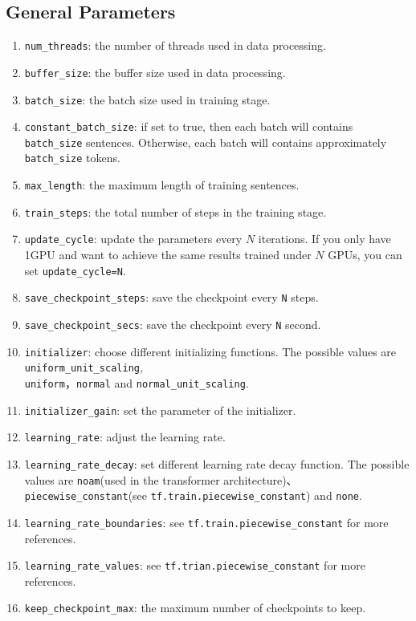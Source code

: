 \documentclass{article}
\begin{document}
\subsection{General Parameters}
\begin{enumerate}
\item \verb|num_threads|: the number of threads used in data processing.
\item \verb|buffer_size|: the buffer size used in data processing.
\item \verb|batch_size|: the batch size used in training stage.
\item \verb|constant_batch_size|: if set to true, then each batch will contains \verb|batch_size| sentences. Otherwise, each batch will contains approximately \verb|batch_size| tokens.
\item \verb|max_length|: the maximum length of training sentences.
\item \verb|train_steps|: the total number of steps in the training stage.
\item \verb|update_cycle|: update the parameters every $N$ iterations. If you only have 1GPU and want to achieve the same results trained under $N$ GPUs, you can set \verb|update_cycle=N|.
\item \verb|save_checkpoint_steps|: save the checkpoint every \verb|N| steps.
\item \verb|save_checkpoint_secs|: save the checkpoint every \verb|N| second.
\item \verb|initializer|: choose different initializing functions. The possible values are \verb|uniform_unit_scaling|,\\ \verb|uniform|，\verb|normal| and \verb|normal_unit_scaling|.
\item \verb|initializer_gain|: set the parameter of the initializer.
\item \verb|learning_rate|: adjust the learning rate.
\item \verb|learning_rate_decay|: set different learning rate decay function. The possible values are \verb|noam|(used in the transformer architecture)、\verb|piecewise_constant|(see \verb|tf.train.piecewise_constant|) and \verb|none|.
\item \verb|learning_rate_boundaries|: see \verb|tf.train.piecewise_constant| for more references.
\item \verb|learning_rate_values|: see \verb|tf.trian.piecewise_constant| for more references.
\item \verb|keep_checkpoint_max|: the maximum number of checkpoints to keep.

\end{enumerate}
\end{document}
